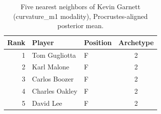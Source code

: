 \begin{table}[htbp]
  \centering\small
  \begin{tabular}{rllc}
    \toprule
    Rank & Player & Position & Archetype \\
    \midrule
    1 & Tom Gugliotta & F & 2 \\
    2 & Karl Malone & F & 2 \\
    3 & Carlos Boozer & F & 2 \\
    4 & Charles Oakley & F & 2 \\
    5 & David Lee & F & 2 \\
    \bottomrule
  \end{tabular}
  \caption{Five nearest neighbors of Kevin Garnett (curvature_m1 modality), Procrustes-aligned posterior mean.}
  \label{tab:Kevin_Garnett_neighbors_curvature_m1}
\end{table}

